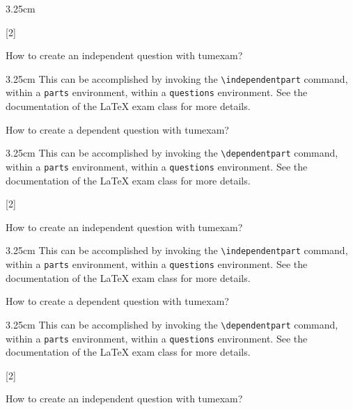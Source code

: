 \documentclass[english, @CLASSOPTIONS@]{tumexam}
\begin{document}
\begin{questions}
\begin{parts}
\begin{solutionbox}{3.25cm}
    \end{solutionbox}
  \end{parts}
  \clearpage
  [2]
  \begin{parts}
    \independentpart
    How to create an independent question with tumexam?
    \begin{solutionbox}{3.25cm}
      This can be accomplished by invoking the \texttt{\textbackslash{independentpart}} command, within a \texttt{parts} environment, within a \texttt{questions} environment. See the documentation of the \LaTeX{} exam class for more details.
    \end{solutionbox}
    \dependentpart
    How to create a dependent question with tumexam?
    \begin{solutionbox}{3.25cm}
      This can be accomplished by invoking the \texttt{\textbackslash{dependentpart}} command, within a \texttt{parts} environment, within a \texttt{questions} environment. See the documentation of the \LaTeX{} exam class for more details.
    \end{solutionbox}
  \end{parts}
  \clearpage
  [2]
  \begin{parts}
    \independentpart
    How to create an independent question with tumexam?
    \begin{solutionbox}{3.25cm}
      This can be accomplished by invoking the \texttt{\textbackslash{independentpart}} command, within a \texttt{parts} environment, within a \texttt{questions} environment. See the documentation of the \LaTeX{} exam class for more details.
    \end{solutionbox}
    \dependentpart
    How to create a dependent question with tumexam?
    \begin{solutionbox}{3.25cm}
      This can be accomplished by invoking the \texttt{\textbackslash{dependentpart}} command, within a \texttt{parts} environment, within a \texttt{questions} environment. See the documentation of the \LaTeX{} exam class for more details.
    \end{solutionbox}
  \end{parts}
  \clearpage
  [2]
  \begin{parts}
    \independentpart
    How to create an independent question with tumexam?

\end{parts}
\end{questions}
\end{document}
